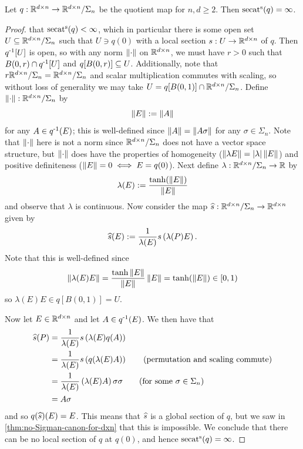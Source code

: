 \begin{theorem}\label{thm:no-local-Sigman-sections}
    Let $q : \R^{d \times n} \to \R^{d \times n}/\Sigma_n$ be the quotient map for $n, d \geq 2$.
    Then $\ssecat(q) = \infty$.
    \begin{proof}
        \Afsoc that $\ssecat(q) < \infty$, which in particular there is some open set $U \sub \R^{d \times n}/\Sigma_n$ such that $U \ni q(0)$ with a local section $s : U \to \R^{d \times n}$ of $q$.
        Then $\inv{q}[U]$ is open, so with any norm $\norm{\cdot}$ on $\R^{d \times n}$, we must have $r > 0$ such that $B(0,r) \cap \inv{q}[U]$ and $q[B(0,r)] \sub U$.
        Additionally, note that $r \R^{d \times n}/\Sigma_n = \R^{d \times n} / \Sigma_n$ and scalar multiplication commutes with scaling, so without loss of generality we may take $U = q[B(0,1)] \cap \R^{d \times n}/\Sigma_n$.
        Define $\norm{\cdot} : \R^{d \times n}/\Sigma_n$ by
        \[
            \norm{E} := \norm{A}
        \]
        for any $A \in \inv{q}(E)$; this is well-defined since $\norm{A} = \norm{A\sigma}$ for any $\sigma \in \Sigma_n$.
        Note that $\norm{\cdot}$ here is not a norm since $\R^{d \times n}/\Sigma_n$ does not have a vector space structure, but $\norm{\cdot}$ does have the properties of homogeneity ($\norm{\lambda E} = \abs{\lambda} \norm{E}$) and positive definiteness ($\norm{E} = 0 \iff E = q(0)$).
        Next define $\lambda : \R^{d \times n}/\Sigma_n \to \R$ by
        \[
            \lambda(E)
            := \f{\tanh(\norm{E})}{\norm{E}}
        \]
        and observe that $\lambda$ is continuous.
        Now consider the map $\Hat{s} : \R^{d \times n}/\Sigma_n \to \R^{d \times n}$ given by
        \[
            \Hat{s}(E)
            := \f{1}{\lambda(E)} s\bigp{\lambda(P) E}.
        \]
        Note that this is well-defined since
        \[
            \norm{\lambda(E) E}
            = \f{\tanh{\norm{E}}}{\norm{E}} \norm{E}
            = \tanh(\norm{E})
            \in [0,1)
        \]
        so $\lambda(E) E \in q[B(0,1)] = U$.

        Now let $E \in \R^{d \times n}$ and let $A \in \inv{q}(E)$.
        We then have that 
        \begin{align*}
            \Hat{s}(P)
            &= \f{1}{\lambda(E)} s\bigp{\lambda(E) q(A)} \\
            &= \f{1}{\lambda(E)} s\bigp{q(\lambda(E) A)} \tag{permutation and scaling commute} \\
            &= \f{1}{\lambda(E)} \bigp{\lambda (E) A} \sigma \sigma \tag{for some $\sigma \in \Sigma_n$} \\
            &= A\sigma
        \end{align*}
        and so $q(\Hat{s})(E) = E$.
        This means that $\Hat{s}$ is a global section of $q$, but we saw in \ref{thm:no-Sigman-canon-for-dxn} that this is impossible.
        We conclude that there can be no local section of $q$ at $q(0)$, and hence $\ssecat(q) = \infty$.
    \end{proof}
\end{theorem}


